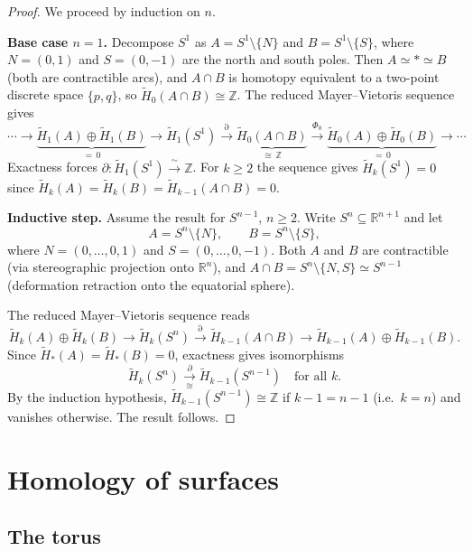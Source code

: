 \documentclass[12pt,a4paper,openany]{book}
\theoremstyle{definition}
\theoremstyle{plain}
\theoremstyle{remark}
\newcommand{\Z}{\mathbb{Z}}
\newcommand{\R}{\mathbb{R}}
\begin{document}
\begin{proof}
We proceed by induction on $n$.

\textbf{Base case $n=1$.}
Decompose $S^1$ as $A=S^1\setminus\{N\}$ and $B=S^1\setminus\{S\}$,
where $N=(0,1)$ and $S=(0,-1)$ are the north and south poles.
Then $A\simeq *\simeq B$ (both are contractible arcs), and
$A\cap B$ is homotopy equivalent to a two-point discrete space
$\{p,q\}$, so $\tilde{H}_0(A\cap B)\cong\Z$.
The reduced Mayer--Vietoris sequence gives
\[
  \cdots\to
  \underbrace{\tilde{H}_1(A)\oplus\tilde{H}_1(B)}_{=\,0}
  \to \tilde{H}_1(S^1) \xrightarrow{\partial}
  \underbrace{\tilde{H}_0(A\cap B)}_{\cong\,\Z}
  \xrightarrow{\Phi_0}
  \underbrace{\tilde{H}_0(A)\oplus\tilde{H}_0(B)}_{=\,0}
  \to \cdots
\]
Exactness forces $\partial\colon\tilde{H}_1(S^1)\xrightarrow{\;\sim\;}\Z$.
For $k\geq 2$ the sequence gives $\tilde{H}_k(S^1)=0$ since
$\tilde{H}_k(A)=\tilde{H}_k(B)=\tilde{H}_{k-1}(A\cap B)=0$.

\textbf{Inductive step.}
Assume the result for $S^{n-1}$, $n\geq 2$. Write $S^n\subseteq\R^{n+1}$
and let
\[
  A = S^n\setminus\{N\},\qquad B = S^n\setminus\{S\},
\]
where $N=(0,\ldots,0,1)$ and $S=(0,\ldots,0,-1)$.
Both $A$ and $B$ are contractible (via stereographic projection onto
$\R^n$), and $A\cap B = S^n\setminus\{N,S\}\simeq S^{n-1}$
(deformation retraction onto the equatorial sphere).

The reduced Mayer--Vietoris sequence reads
\[
  \tilde{H}_k(A)\oplus\tilde{H}_k(B) \to
  \tilde{H}_k(S^n) \xrightarrow{\partial}
  \tilde{H}_{k-1}(A\cap B) \to
  \tilde{H}_{k-1}(A)\oplus\tilde{H}_{k-1}(B).
\]
Since $\tilde{H}_*(A)=\tilde{H}_*(B)=0$, exactness gives isomorphisms
\[
  \tilde{H}_k(S^n) \xrightarrow[\cong]{\;\partial\;}
  \tilde{H}_{k-1}(S^{n-1})
  \quad\text{for all } k.
\]
By the induction hypothesis,
$\tilde{H}_{k-1}(S^{n-1})\cong\Z$ if $k-1=n-1$ (i.e.\ $k=n$) and
vanishes otherwise. The result follows.
\end{proof}

\section{Homology of surfaces}
\label{sec:mv-surfaces}

\subsection{The torus}\label{subsec:mv-torus}
\end{document}
